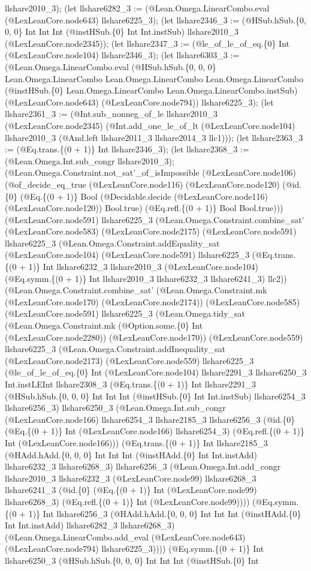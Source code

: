 \documentclass[11pt]{article}
\begin{document}
llshare2010\_3); (let llshare6282\_3 := (@Lean.Omega.LinearCombo.eval (@LexLeanCore.node643) llshare6225\_3); (let llshare2346\_3 := (@HSub.hSub.\{0, 0, 0\} Int Int Int (@instHSub.\{0\} Int Int.instSub) llshare2010\_3 (@LexLeanCore.node2345)); (let llshare2347\_3 := (@le\_of\_le\_of\_eq.\{0\} Int (@LexLeanCore.node104) llshare2346\_3); (let llshare6303\_3 := (@Lean.Omega.LinearCombo.eval (@HSub.hSub.\{0, 0, 0\} Lean.Omega.LinearCombo Lean.Omega.LinearCombo Lean.Omega.LinearCombo (@instHSub.\{0\} Lean.Omega.LinearCombo Lean.Omega.LinearCombo.instSub) (@LexLeanCore.node643) (@LexLeanCore.node794)) llshare6225\_3); (let llshare2361\_3 := (@Int.sub\_nonneg\_of\_le llshare2010\_3 (@LexLeanCore.node2345) (@Int.add\_one\_le\_of\_lt (@LexLeanCore.node104) llshare2010\_3 (@And.left llshare2011\_3 llshare2014\_3 llc1))); (let llshare2363\_3 := (@Eq.trans.\{(0 + 1)\} Int llshare2346\_3); (let llshare2368\_3 := (@Lean.Omega.Int.sub\_congr llshare2010\_3); (@Lean.Omega.Constraint.not\_sat'\_of\_isImpossible (@LexLeanCore.node106) (@of\_decide\_eq\_true (@LexLeanCore.node116) (@LexLeanCore.node120) (@id.\{0\} (@Eq.\{(0 + 1)\} Bool (@Decidable.decide (@LexLeanCore.node116) (@LexLeanCore.node120)) Bool.true) (@Eq.refl.\{(0 + 1)\} Bool Bool.true))) (@LexLeanCore.node591) llshare6225\_3 (@Lean.Omega.Constraint.combine\_sat' (@LexLeanCore.node583) (@LexLeanCore.node2175) (@LexLeanCore.node591) llshare6225\_3 (@Lean.Omega.Constraint.addEquality\_sat (@LexLeanCore.node104) (@LexLeanCore.node591) llshare6225\_3 (@Eq.trans.\{(0 + 1)\} Int llshare6232\_3 llshare2010\_3 (@LexLeanCore.node104) (@Eq.symm.\{(0 + 1)\} Int llshare2010\_3 llshare6232\_3 llshare6241\_3) llc2)) (@Lean.Omega.Constraint.combine\_sat' (@Lean.Omega.Constraint.mk (@LexLeanCore.node170) (@LexLeanCore.node2174)) (@LexLeanCore.node585) (@LexLeanCore.node591) llshare6225\_3 (@Lean.Omega.tidy\_sat (@Lean.Omega.Constraint.mk (@Option.some.\{0\} Int (@LexLeanCore.node2280)) (@LexLeanCore.node170)) (@LexLeanCore.node559) llshare6225\_3 (@Lean.Omega.Constraint.addInequality\_sat (@LexLeanCore.node2173) (@LexLeanCore.node559) llshare6225\_3 (@le\_of\_le\_of\_eq.\{0\} Int (@LexLeanCore.node104) llshare2291\_3 llshare6250\_3 Int.instLEInt llshare2308\_3 (@Eq.trans.\{(0 + 1)\} Int llshare2291\_3 (@HSub.hSub.\{0, 0, 0\} Int Int Int (@instHSub.\{0\} Int Int.instSub) llshare6254\_3 llshare6256\_3) llshare6250\_3 (@Lean.Omega.Int.sub\_congr (@LexLeanCore.node166) llshare6254\_3 llshare2185\_3 llshare6256\_3 (@id.\{0\} (@Eq.\{(0 + 1)\} Int (@LexLeanCore.node166) llshare6254\_3) (@Eq.refl.\{(0 + 1)\} Int (@LexLeanCore.node166))) (@Eq.trans.\{(0 + 1)\} Int llshare2185\_3 (@HAdd.hAdd.\{0, 0, 0\} Int Int Int (@instHAdd.\{0\} Int Int.instAdd) llshare6232\_3 llshare6268\_3) llshare6256\_3 (@Lean.Omega.Int.add\_congr llshare2010\_3 llshare6232\_3 (@LexLeanCore.node99) llshare6268\_3 llshare6241\_3 (@id.\{0\} (@Eq.\{(0 + 1)\} Int (@LexLeanCore.node99) llshare6268\_3) (@Eq.refl.\{(0 + 1)\} Int (@LexLeanCore.node99)))) (@Eq.symm.\{(0 + 1)\} Int llshare6256\_3 (@HAdd.hAdd.\{0, 0, 0\} Int Int Int (@instHAdd.\{0\} Int Int.instAdd) llshare6282\_3 llshare6268\_3) (@Lean.Omega.LinearCombo.add\_eval (@LexLeanCore.node643) (@LexLeanCore.node794) llshare6225\_3)))) (@Eq.symm.\{(0 + 1)\} Int llshare6250\_3 (@HSub.hSub.\{0, 0, 0\} Int Int Int (@instHSub.\{0\} Int 
\end{document}
